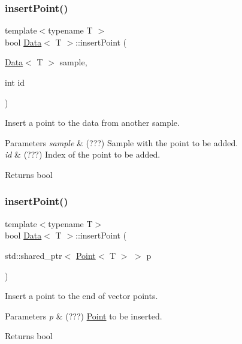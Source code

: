 \subsubsection{\texorpdfstring{insert\+Point()}{insertPoint()}\hspace{0.1cm}{\footnotesize\ttfamily [1/2]}}
{\footnotesize\ttfamily template$<$typename T $>$ \\
bool \hyperlink{class_data}{Data}$<$ T $>$\+::insert\+Point (\begin{DoxyParamCaption}\item[{\hyperlink{class_data}{Data}$<$ T $>$}]{sample,  }\item[{int}]{id }\end{DoxyParamCaption})}



Insert a point to the data from another sample. 


\begin{DoxyParams}{Parameters}
{\em sample} & (???) Sample with the point to be added. \\
\hline
{\em id} & (???) Index of the point to be added. \\
\hline
\end{DoxyParams}
\begin{DoxyReturn}{Returns}
bool 
\end{DoxyReturn}
\mbox{\label{class_data_a709cae94a533608e61a5e1e5039b0b35}} 
\subsubsection{\texorpdfstring{insert\+Point()}{insertPoint()}\hspace{0.1cm}{\footnotesize\ttfamily [2/2]}}
{\footnotesize\ttfamily template$<$typename T$>$ \\
bool \hyperlink{class_data}{Data}$<$ T $>$\+::insert\+Point (\begin{DoxyParamCaption}\item[{std\+::shared\+\_\+ptr$<$ \hyperlink{class_point}{Point}$<$ T $>$ $>$}]{p }\end{DoxyParamCaption})}



Insert a point to the end of vector points. 


\begin{DoxyParams}{Parameters}
{\em p} & (???) \hyperlink{class_point}{Point} to be inserted. \\
\hline
\end{DoxyParams}
\begin{DoxyReturn}{Returns}
bool 
\end{DoxyReturn}
\mbox{\label{class_data_a8b96bf083edf16dd41031c254d32e143}} 
